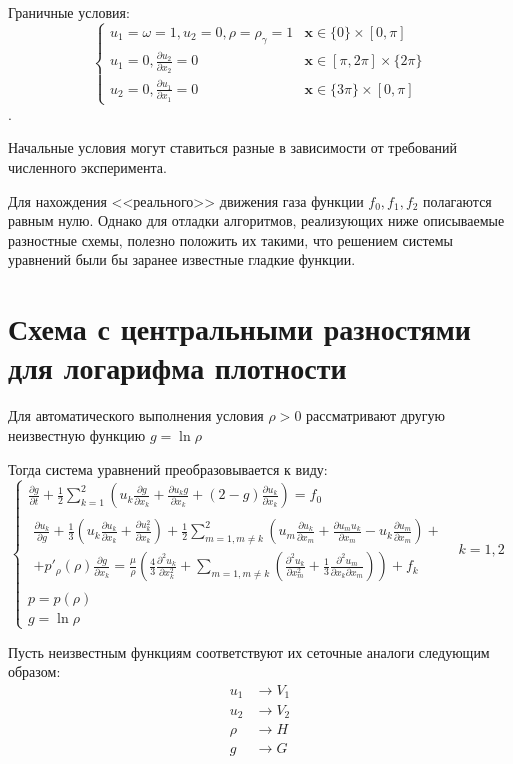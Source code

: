 \documentclass[specialist,subf,href,colorlinks=true,14pt,times,mtpro]{disser}
\newcommand{\pdrv}[2]{\frac{\partial #1}{\partial #2}}
\begin{document}
Граничные условия: 
$$
\begin{cases}
u_1 = \omega = 1, u_2 = 0, \rho = \rho_\gamma = 1 & \textbf{x} \in \{0\} \times [0, \pi] \\
u_1 = 0, \pdrv{u_2}{x_2} = 0 & \textbf{x} \in [\pi, 2\pi] \times \{2\pi\} \\
u_2 = 0, \pdrv{u_1}{x_1} = 0 & \textbf{x} \in \{3\pi\} \times [0, \pi]
\end{cases}
$$.

Начальные условия могут ставиться разные в зависимости от требований численного эксперимента.

Для нахождения <<реального>> движения газа функции $f_0, f_1, f_2$ полагаются равным нулю. Однако для отладки алгоритмов, реализующих ниже описываемые разностные схемы, полезно положить их такими, что решением системы уравнений были бы заранее известные гладкие функции.

\section{Схема с центральными разностями \\ для логарифма плотности}

Для автоматического выполнения условия $\rho > 0$ рассматривают другую неизвестную функцию $g = \ln \rho$

Тогда система уравнений преобразовывается к виду:
$$
\begin{cases}
\pdrv{g}{t} + \frac{1}{2} \sum_{k = 1}^2 \left(u_k \pdrv{g}{x_k} + \pdrv{u_k g}{x_k} + (2 - g) \pdrv{u_k}{x_k} \right) = f_0 \\
\begin{array}{l}
\pdrv{u_k}{g} + \frac{1}{3} \left(u_k \pdrv{u_k}{x_k} + \pdrv{u_k^2}{x_k}\right) + \frac{1}{2} \sum_{m = 1, m \ne k}^2 \left(u_m \pdrv{u_k}{x_m} + \pdrv{u_m u_k}{x_m} - u_k \pdrv{u_m}{x_m}\right) + \\
 + p'_\rho (\rho) \pdrv{g}{x_k} = \frac{\mu}{\rho} \left(\frac{4}{3} \pdrv{^2 u_k}{x_k^2} + \sum_{m = 1, m \ne k} \left(\pdrv{^2 u_k}{x_m^2} + \frac{1}{3} \pdrv{^2 u_m}{x_k \partial x_m}\right)\right) + f_k
\end{array} & k = 1,2 \\
p = p (\rho) \\
g = \ln \rho
\end{cases}
$$

Пусть неизвестным функциям соответствуют их сеточные аналоги следующим образом:
$$
\begin{aligned}
u_1  &\rightarrow V_1 \\
u_2  &\rightarrow V_2 \\ 
\rho &\rightarrow H \\
g    &\rightarrow G \\
\end{aligned} 
$$
\end{document}
